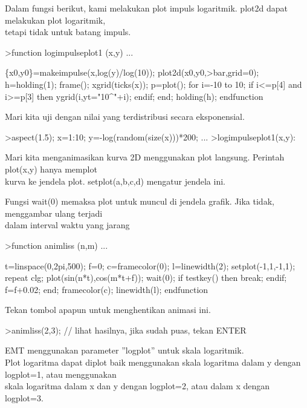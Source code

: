 \documentclass[a4paper,10pt]{article}
\begin{document}
\begin{eulernotebook}
\begin{eulercomment}
\begin{eulercomment}
\begin{eulercomment}
\begin{eulercomment}
\begin{eulercomment}
\begin{eulercomment}
\begin{eulercomment}
Dalam fungsi berikut, kami melakukan plot impuls logaritmik. plot2d
dapat melakukan plot logaritmik,\\
tetapi tidak untuk batang impuls.
\end{eulercomment}
\begin{eulerprompt}
>function logimpulseplot1 (x,y) ...
\end{eulerprompt}
\begin{eulerudf}
    \{x0,y0\}=makeimpulse(x,log(y)/log(10));
    plot2d(x0,y0,>bar,grid=0);
    h=holding(1);
    frame();
    xgrid(ticks(x));
    p=plot();
    for i=-10 to 10;
      if i<=p[4] and i>=p[3] then
         ygrid(i,yt="10^"+i);
      endif;
    end;
    holding(h);
  endfunction
\end{eulerudf}
\begin{eulercomment}
Mari kita uji dengan nilai yang terdistribusi secara eksponensial.
\end{eulercomment}
\begin{eulerprompt}
>aspect(1.5); x=1:10; y=-log(random(size(x)))*200; ...
>logimpulseplot1(x,y):
\end{eulerprompt}
\begin{eulercomment}
Mari kita menganimasikan kurva 2D menggunakan plot langsung. Perintah
plot(x,y) hanya memplot\\
kurva ke jendela plot. setplot(a,b,c,d) mengatur jendela ini.

Fungsi wait(0) memaksa plot untuk muncul di jendela grafik. Jika
tidak, menggambar ulang terjadi\\
dalam interval waktu yang jarang
\end{eulercomment}
\begin{eulerprompt}
>function animliss (n,m) ...
\end{eulerprompt}
\begin{eulerudf}
  t=linspace(0,2pi,500);
  f=0;
  c=framecolor(0);
  l=linewidth(2);
  setplot(-1,1,-1,1);
  repeat
    clg;
    plot(sin(n*t),cos(m*t+f));
    wait(0);
    if testkey() then break; endif;
    f=f+0.02;
  end;
  framecolor(c);
  linewidth(l);
  endfunction
\end{eulerudf}
\begin{eulercomment}
Tekan tombol apapun untuk menghentikan animasi ini.
\end{eulercomment}
\begin{eulerprompt}
>animliss(2,3); // lihat hasilnya, jika sudah puas, tekan ENTER
\end{eulerprompt}
\begin{eulercomment}
EMT menggunakan parameter ”logplot” untuk skala logaritmik.\\
Plot logaritma dapat diplot baik menggunakan skala logaritma dalam y
dengan logplot=1, atau menggunakan\\
skala logaritma dalam x dan y dengan logplot=2, atau dalam x dengan
logplot=3.


\end{eulercomment}
\end{eulercomment}
\end{eulercomment}
\end{eulercomment}
\end{eulercomment}
\end{eulercomment}
\end{eulercomment}
\end{eulernotebook}
\end{document}

